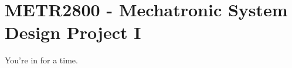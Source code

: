\hypertarget{METR2800}{\section{METR2800 - Mechatronic System Design Project I}}
You're in for a time.
